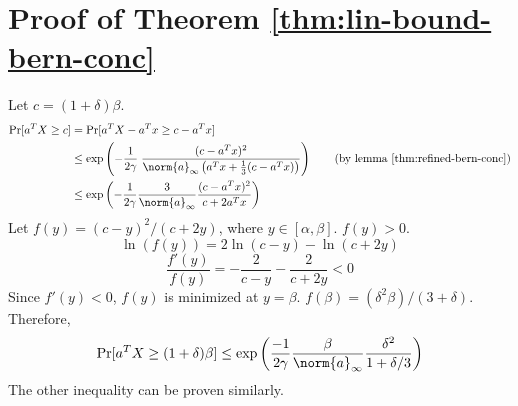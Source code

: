 \section{Proof of Theorem \ref{thm:lin-bound-bern-conc}}\label{proof-for-thm3}
Let $c = (1+\delta)\beta$.
\begin{align*}
\Pr[ a^TX \ge c ]
&= \Pr[ a^TX - a^Tx \ge c - a^Tx ]
\\ &\le \exp\left( -\frac{1}{2\gamma} \; \frac{(c-a^Tx)^2}{\norm{a}_{\infty}
\left(a^Tx + \frac{1}{3}(c - a^Tx)\right)} \right)
\tag{by lemma \ref{thm:refined-bern-conc}}
\\ &\le \exp\left( -\frac{1}{2\gamma} \frac{3}{\norm{a}_{\infty}} \frac{(c-a^Tx)^2}{c + 2a^Tx} \right)
\end{align*}
Let $f(y) = (c-y)^2/(c+2y)$, where $y \in [\alpha, \beta]$. $f(y) > 0$.
\[ \ln(f(y)) = 2\ln(c-y) - \ln(c+2y) \]
\[ \frac{f'(y)}{f(y)} = -\frac{2}{c-y} - \frac{2}{c+2y} < 0 \]
Since $f'(y) < 0$, $f(y)$ is minimized at $y = \beta$.
$f(\beta) = (\delta^2\beta)/(3 + \delta)$.
Therefore,
\[ \Pr[ a^TX \ge (1+\delta)\beta ]
\le \exp\left( \frac{-1}{2\gamma} \frac{\beta}{\norm{a}_{\infty}} \frac{\delta^2}{1+\delta/3} \right) \]
The other inequality can be proven similarly.

